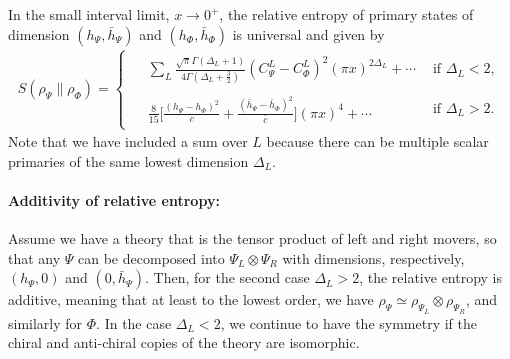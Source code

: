 \documentclass[11pt]{article}
\newcommand{\lb}{\left(}
\newcommand{\rb}{\right)}
\begin{document}
  In the small interval limit, $x\to 0^+$, the relative entropy of primary states of dimension 
  $(h_\Psi,\bar{h}_\Psi)$ and $(h_\Phi,\bar{h}_\Phi)$
  is universal and given by  
\begin{align}\label{Ssmallx}
\boxed{
S(\rho_\Psi\|\rho_\Phi)
=
\begin{cases}
\begin{aligned}
&\sum_L\frac{\sqrt{\pi}\Gamma(\Delta_L+1)}
{4\Gamma(\Delta_L+\frac32)}
(C^L_{\Psi}-C^L_{\Phi})^2 
(\pi x)^{2\Delta_L}
+\cdots
\end{aligned}
&
\text{if }\Delta_L< 2,
\\[2ex]
\begin{aligned}
&\frac{8}{15}
\Bigg[
\frac{(h_\Psi-h_\Phi)^2}{c} 
+\frac{(\bar h_\Psi-\bar h_\Phi)^2}{\bar c}
\Bigg]
(\pi x)^4
+\cdots
\end{aligned}
&
\text{if }\Delta_L>2 .
\end{cases}
}
\end{align}
Note that we have included a sum over $L$ because there can be multiple scalar primaries of the same lowest dimension $\Delta_L$. 

\paragraph{Additivity of relative entropy:} Assume we have a theory that is the tensor product of left and right movers, so that any $\Psi$ can be decomposed into $\Psi_L\otimes \Psi_R$ with dimensions, respectively, $(h_\Psi,0)$ and $(0,\bar{h}_\Psi)$. Then, for the second case $\Delta_L>2$, the relative entropy is additive, meaning that at least to the lowest order, we have $\rho_\Psi\simeq\rho_{\Psi_L}\otimes \rho_{\Psi_R}$, and similarly for $\Phi$. In the case $\Delta_L<2$, we continue to have the symmetry if the chiral and anti-chiral copies of the theory are isomorphic.
\end{document}

